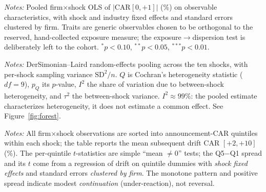 \documentclass[12pt]{article}
\begin{document}
\begin{table}[htbp]\centering
\begin{threeparttable}
\caption{Pooled determinants of reaction magnitude (observable traits only)}\label{tab:pooled}\small

\begin{tablenotes}\small\item \textit{Notes:} Pooled firm$\times$shock OLS of $|\text{CAR}[0,+1]|$
(\%) on observable characteristics, with shock and industry fixed effects and standard errors
clustered by firm. Traits are generic observables chosen to be orthogonal to the reserved,
hand-collected exposure measure; the exposure$\to$dispersion test is deliberately left to the
cohort. $^{*}p<0.10$, $^{**}p<0.05$, $^{***}p<0.01$.
\end{tablenotes}
\end{threeparttable}
\end{table}

\begin{table}[htbp]\centering
\begin{threeparttable}
\caption{Random-effects meta-analysis of propagation across shocks}\label{tab:metare}\small

\begin{tablenotes}\small\item \textit{Notes:} DerSimonian--Laird random-effects pooling across the
ten shocks, with per-shock sampling variance $\text{SD}^2/n$. $Q$ is Cochran's heterogeneity
statistic ($df=9$), $p_Q$ its $p$-value, $I^2$ the share of variation due to between-shock
heterogeneity, and $\tau^2$ the between-shock variance. $I^2\approx 99\%$: the pooled estimate
characterizes heterogeneity, it does not estimate a common effect. See Figure~\ref{fig:forest}.
\end{tablenotes}
\end{threeparttable}
\end{table}

\begin{table}[htbp]\centering
\begin{threeparttable}
\caption{Aggregate propagation: post-event drift by announcement-CAR quintile}\label{tab:overreact}\small

\begin{tablenotes}\small\item \textit{Notes:} All firm$\times$shock observations are sorted into
announcement-CAR quintiles within each shock; the table reports the mean subsequent drift CAR
$[+2,+10]$ (\%). The per-quintile $t$-statistics are simple ``mean $\neq 0$'' tests; the Q5$-$Q1
spread and its $t$ come from a regression of drift on quintile dummies with \emph{shock fixed effects}
and standard errors \emph{clustered by firm}. The monotone pattern and positive spread indicate
modest \emph{continuation} (under-reaction), not reversal.
\end{tablenotes}
\end{threeparttable}
\end{table}
\end{document}

